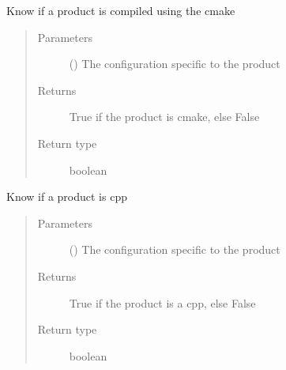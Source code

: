 \documentclass[a4paper,10pt,english]{sphinxmanual}
\begin{document}

\begin{fulllineitems}
\label{\detokenize{commands/apidoc/src:src.product.product_is_cmake}}
Know if a product is compiled using the cmake
\begin{quote}\begin{description}
\item[{Parameters}] \leavevmode
{} () \textendash{} The configuration specific to 
the product

\item[{Returns}] \leavevmode
True if the product is cmake, else False

\item[{Return type}] \leavevmode
boolean

\end{description}\end{quote}

\end{fulllineitems}


\begin{fulllineitems}
\label{\detokenize{commands/apidoc/src:src.product.product_is_cpp}}
Know if a product is cpp
\begin{quote}\begin{description}
\item[{Parameters}] \leavevmode
{} () \textendash{} The configuration specific to 
the product

\item[{Returns}] \leavevmode
True if the product is a cpp, else False

\item[{Return type}] \leavevmode
boolean

\end{description}\end{quote}

\end{fulllineitems}
\end{document}
